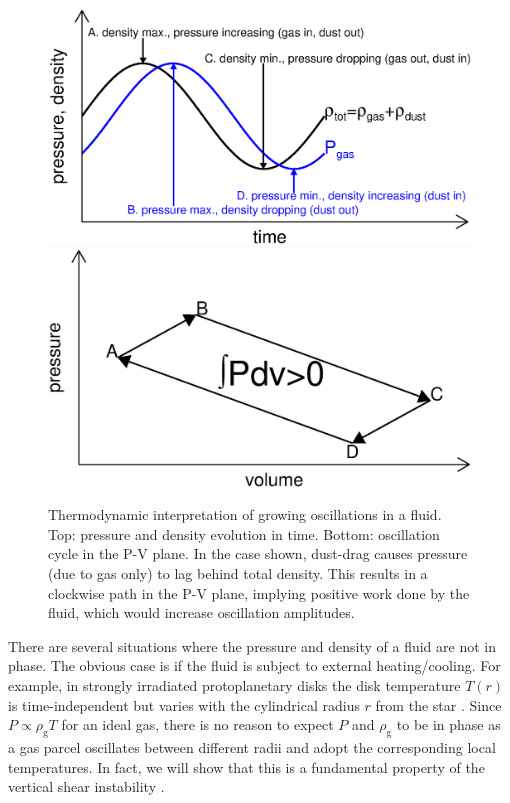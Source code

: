 \documentclass[iop, numberedappendix]{emulateapj}
\newcommand{\rhog}{\rho_\mathrm{g}}
\begin{document}
\begin{figure}
  \includegraphics[width=\linewidth]{figures/drag}\\
\includegraphics[width=\linewidth]{figures/pdv}
  \caption{Thermodynamic interpretation of growing oscillations in a
    fluid. Top: pressure and density evolution in time. 
    Bottom: oscillation cycle in the P-V plane. In the case shown, 
    dust-drag causes  
    pressure (due to gas only) to lag behind total density. This results in a clockwise path in
    the P-V plane, implying positive work done by the fluid, which 
     would increase oscillation amplitudes.  
    \label{pdv_cartoon}
  }
\end{figure}

There are several situations where the pressure and density of a fluid
are not in phase. The obvious case is if the fluid is subject to
external heating/cooling. For example, in strongly irradiated
protoplanetary disks the
disk temperature  $T(r)$ is time-independent but varies with the cylindrical radius
$r$ from the star \citep{chiang97}. Since $P\propto \rhog T$ for an
ideal gas, %
there is no reason to expect $P$ and $\rhog$ to 
be in phase as a gas parcel oscillates between different radii and adopt the corresponding local temperatures. 
 In 
fact, we will show that this is a fundamental property of the vertical
shear instability \citep{lin15}.   
\end{document}
